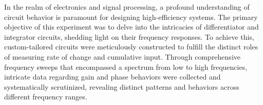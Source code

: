 \abstract
In the realm of electronics and signal processing, a profound understanding of circuit behavior is paramount for designing high-efficiency systems. 
The primary objective of this experiment was to delve into the intricacies of differentiator and integrator circuits, shedding light on their frequency responses.
To achieve this, custom-tailored circuits were meticulously constructed to fulfill the distinct roles of measuring rate of change and cumulative input. 
Through comprehensive frequency sweeps that encompassed a spectrum from low to high frequencies, intricate data regarding gain and phase behaviors were collected and systematically scrutinized, 
revealing distinct patterns and behaviors across different frequency ranges. 